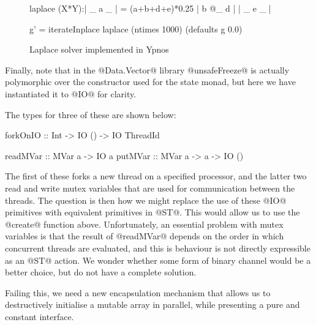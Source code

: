 \begin{figure}
\begin{code}           
  laplace (X*Y):| _ a _  | = (a+b+d+e)*0.25 
                | b @_ d |
                | _ e _  | 

  g’ = iterateInplace laplace 
          (ntimes 1000) (defaults g 0.0)	
\end{code}

\label{fig:LaplaceYpnos}
\caption{Laplace solver implemented in Ypnos \cite{Orchard:ypnos}}
\end{figure}



Finally, note that in the @Data.Vector@ library @unsafeFreeze@ is actually polymorphic over the constructor used for the state monad, but here we have instantiated it to @IO@ for clarity.


The types for three of these are shown below: 

\begin{code}
  forkOnIO :: Int -> IO () -> IO ThreadId

  readMVar :: MVar a -> IO a
  putMVar  :: MVar a -> a -> IO ()
\end{code}

The first of these forks a new thread on a specified processor, and the latter two read and write mutex variables that are used for communication between the threads. The question is then how we might replace the use of these @IO@ primitives with equivalent primitives in @ST@. This would allow us to use the @create@ function above. Unfortunately, an essential problem with mutex variables is that the result of @readMVar@ depends on the order in which concurrent threads are evaluated, and this is behaviour is not directly expressible as an @ST@ action. We wonder whether some form of binary channel would be a better choice, but do not have a complete solution.

Failing this, we need a new encapsulation mechanism that allows us to destructively initialise a mutable array in parallel, while presenting a pure and constant interface.